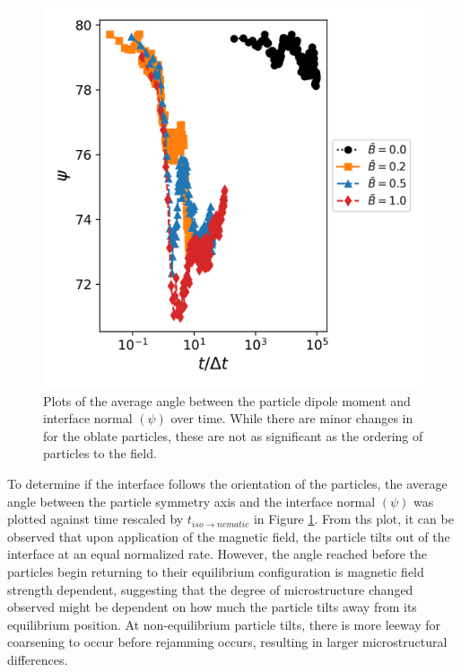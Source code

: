 \begin{figure}
    \centering
    \includegraphics[scale = 0.5]{figures/results/paper2/interface_angle.png}
    \caption{Plots of the average angle between the particle dipole moment and interface normal $(\psi)$ over time. While there are minor changes in for the oblate particles, these are not as significant as the ordering of particles to the field.}
    \label{fig:P2_interface_angle}
\end{figure}

To determine if the interface follows the orientation of the particles, the average angle between the 
particle symmetry axis and the interface normal $(\psi)$ was plotted against time rescaled by 
$t_{iso \rightarrow nematic}$ in Figure \ref{fig:P2_interface_angle}. From ths plot, it can be 
observed that upon application of the magnetic field, the particle tilts out of the interface at 
an equal normalized rate. However, the angle reached before the particles begin returning to their 
equilibrium configuration is magnetic field strength dependent, suggesting that the degree of 
microstructure changed observed might be dependent on how much the particle tilts away from its 
equilibrium position. At non-equilibrium particle tilts, there is more leeway for coarsening to 
occur before rejamming occurs, resulting in larger microstructural differences. 

